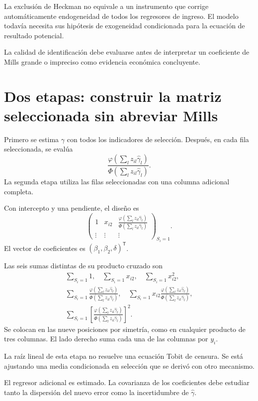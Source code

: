 \documentclass[11pt,a4paper]{article}
\newcommand{\T}{^{\mathsf T}}
\begin{document}
La exclusión de Heckman
no equivale a un instrumento
que corrige automáticamente
endogeneidad de todos los
regresores de ingreso.
El modelo todavía necesita
sus hipótesis de exogeneidad
condicionada para la ecuación
de resultado potencial.

La calidad de identificación
debe evaluarse antes de
interpretar un coeficiente
de Mills grande o impreciso
como evidencia económica concluyente.

\clearpage
\section{Dos etapas: construir la matriz seleccionada sin abreviar Mills}\label{unidad129}
Primero se estima \(\gamma\)
con todos los indicadores de selección.
Después, en cada fila seleccionada,
se evalúa
\[
\frac{\varphi(\sum_lz_{il}\widehat\gamma_l)}
{\Phi(\sum_lz_{il}\widehat\gamma_l)}.
\]
La segunda etapa utiliza las
filas seleccionadas con una
columna adicional completa.

Con intercepto y una pendiente,
el diseño es
\[
\begin{pmatrix}
1&x_{i2}&
\frac{\varphi(\sum_lz_{il}\widehat\gamma_l)}
{\Phi(\sum_lz_{il}\widehat\gamma_l)}\\
\vdots&\vdots&\vdots
\end{pmatrix}_{S_i=1}.
\]
El vector de coeficientes es
\((\beta_1,\beta_2,\delta)\T\).

Las seis sumas distintas de
su producto cruzado son
\[
\begin{gathered}
\sum_{S_i=1}1,\quad
\sum_{S_i=1}x_{i2},\quad
\sum_{S_i=1}x_{i2}^2,\\
\sum_{S_i=1}
\frac{\varphi(\sum_lz_{il}\widehat\gamma_l)}
{\Phi(\sum_lz_{il}\widehat\gamma_l)},\quad
\sum_{S_i=1}x_{i2}
\frac{\varphi(\sum_lz_{il}\widehat\gamma_l)}
{\Phi(\sum_lz_{il}\widehat\gamma_l)},\\
\sum_{S_i=1}\left[
\frac{\varphi(\sum_lz_{il}\widehat\gamma_l)}
{\Phi(\sum_lz_{il}\widehat\gamma_l)}
\right]^2.
\end{gathered}
\]
Se colocan en las nueve
posiciones por simetría,
como en cualquier producto
de tres columnas.
El lado derecho suma cada
una de las columnas por \(y_i\).

La raíz lineal de esta etapa
no resuelve una ecuación
Tobit de censura.
Se está ajustando una
media condicionada en selección
que se derivó con otro mecanismo.

El regresor adicional es estimado.
La covarianza de los coeficientes
debe estudiar tanto
la dispersión del nuevo error
como la incertidumbre de
\(\widehat\gamma\).
\end{document}
